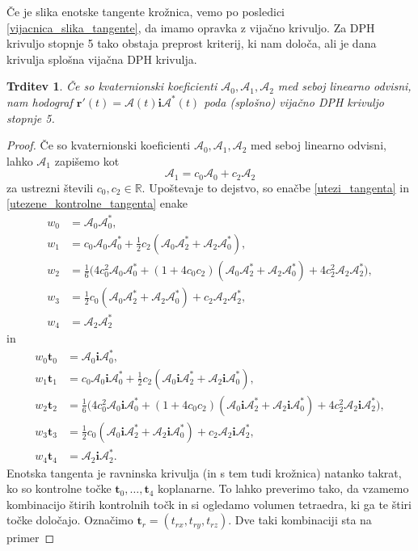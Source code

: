 \documentclass[12pt,a4paper,twoside]{article}
\theoremstyle{definition} %
\theoremstyle{plain} %
\newtheorem{trditev}[definicija]{Trditev}
\theoremstyle{primerstyle}
\numberwithin{equation}{section}  %
\newcommand{\R}{\mathbb R}
\newcommand{\tV}{\mathbf{t}}
\newcommand{\rV}{\mathbf{r}}
\newcommand{\iV}{\mathbf{i}}
\newcommand{\AQ}{\mathcal{A}}
\begin{document}
Če je slika enotske tangente krožnica, vemo po posledici \ref{vijacnica_slika_tangente}, da imamo opravka z vijačno krivuljo. Za DPH krivuljo stopnje 5 tako obstaja preprost kriterij, ki nam določa, ali je dana krivulja splošna vijačna DPH krivulja.
\begin{trditev}
	\label{lin_odvisnost_pogoj_helix}
	Če so kvaternionski koeficienti $\AQ_0,\AQ_1,\AQ_2$ med seboj linearno odvisni, nam hodograf $\rV'(t)=\AQ(t)\iV\AQ^*(t)$ poda (splošno) vijačno DPH krivuljo stopnje 5.
\end{trditev}
\begin{proof}
	Če so kvaternionski koeficienti $\AQ_0,\AQ_1,\AQ_2$ med seboj linearno odvisni, lahko $\AQ_1$ zapišemo kot
	\begin{equation}
		\label{AQ1_lin_odv}
		\AQ_1=c_0\AQ_0+c_2\AQ_2
	\end{equation}
	za ustrezni števili $c_0,c_2\in\R.$ Upoštevaje to dejstvo, so enačbe \eqref{utezi_tangenta} in \eqref{utezene_kontrolne_tangenta} enake
	\begin{align}
		\label{utezi_tangenta_2}
		w_0&=\AQ_0\AQ_0^*,\nonumber\\
		w_1&=c_0\AQ_0\AQ_0^*+\frac{1}{2}c_2(\AQ_0\AQ_2^*+\AQ_2\AQ_0^*),\nonumber\\
		w_2&=\frac{1}{6}\big(4c_0^2\AQ_0\AQ_0^*+(1+4c_0c_2)(\AQ_0\AQ_2^*+\AQ_2\AQ_0^*)+4c_2^2\AQ_2\AQ_2^*\big),\\
		w_3&=\frac{1}{2}c_0(\AQ_0\AQ_2^*+\AQ_2\AQ_0^*)+c_2\AQ_2\AQ_2^*,\nonumber\\
		w_4&=\AQ_2\AQ_2^*\nonumber
	\end{align}
	in
	\begin{align}
		\label{utezene_kontrolne_tangenta_2}
		w_0\tV_0&=\AQ_0\iV\AQ_0^*,\nonumber\\
		w_1\tV_1&=c_0\AQ_0\iV\AQ_0^*+\frac{1}{2}c_2(\AQ_0\iV\AQ_2^*+\AQ_2\iV\AQ_0^*),\nonumber\\
		w_2\tV_2&=\frac{1}{6}\big(4c_0^2\AQ_0\iV\AQ_0^*+(1+4c_0c_2)(\AQ_0\iV\AQ_2^*+\AQ_2\iV\AQ_0^*)+4c_2^2\AQ_2\iV\AQ_2^*\big),\\
		w_3\tV_3&=\frac{1}{2}c_0(\AQ_0\iV\AQ_2^*+\AQ_2\iV\AQ_0^*)+c_2\AQ_2\iV\AQ_2^*,\nonumber\\
		w_4\tV_4&=\AQ_2\iV\AQ_2^*.\nonumber
	\end{align}
	Enotska tangenta je ravninska krivulja (in s tem tudi krožnica) natanko takrat, ko so kontrolne točke $\tV_0,\dots,\tV_4$ koplanarne. To lahko preverimo tako, da vzamemo kombinacijo štirih kontrolnih točk in si ogledamo volumen tetraedra, ki ga te štiri točke določajo. Označimo $\tV_r=(t_{rx},t_{ry},t_{rz}).$ Dve taki kombinaciji sta na primer

\end{proof}
\end{document}
